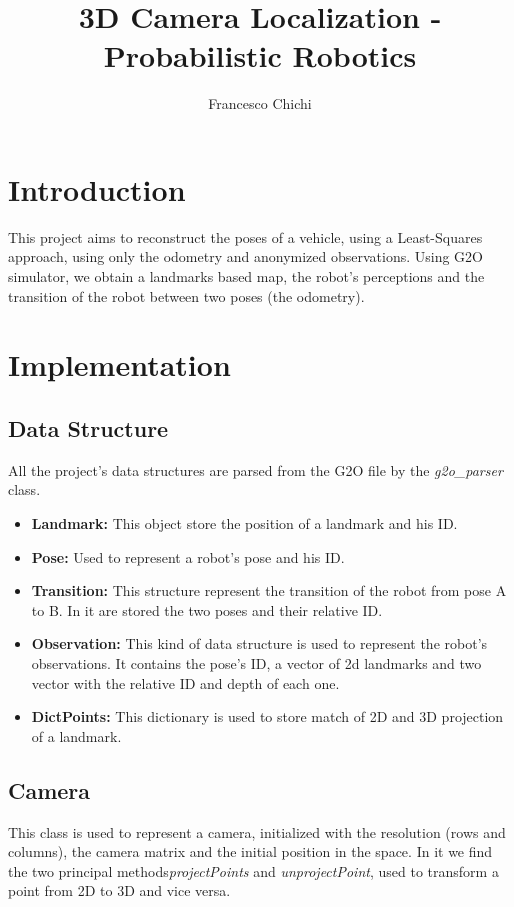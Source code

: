 \documentclass[10pt]{article}
\title{3D Camera Localization - Probabilistic Robotics}
\author{ Francesco Chichi}
\begin{document}
	\maketitle
	\section{Introduction}
		This project aims to reconstruct the poses of a vehicle, using a Least-Squares approach, using only the odometry and anonymized observations. 
		Using G2O simulator, we obtain a landmarks based map, the robot's perceptions and the transition of the robot between two poses (the odometry).

	\section{Implementation}
		\subsection{Data Structure}
		All the project's data structures are parsed from the G2O file by the \textit{g2o\_parser} class.
		\begin{itemize}
			\item \textbf{Landmark:} This object store the position of a landmark and his ID.
			\item \textbf{Pose:} Used to represent a robot's pose and his ID.
			\item \textbf{Transition:} This structure represent the transition of the robot from pose A to B. In it are stored the two poses and their relative ID.
			\item \textbf{Observation:} This kind of data structure is used to represent the robot's observations. 
			It contains the pose's ID, a vector of 2d landmarks and two vector with the relative ID and depth of each one.
			\item \textbf{DictPoints:} This dictionary is used to store match of 2D and 3D projection of a landmark.
		\end{itemize}
	
		\subsection{Camera}
		This class is used to represent a camera, initialized with the resolution (rows and columns), the camera matrix and the initial position in the space.
		In it we find the two principal methods\textit{projectPoints} and \textit{unprojectPoint}, used to transform a point from 2D to 3D and vice versa.
		
\end{document}
